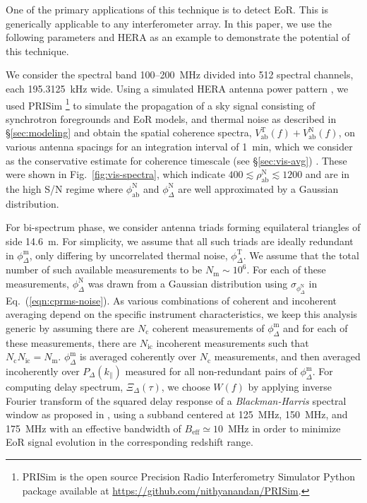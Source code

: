 \documentclass[
reprint,
superscriptaddress,
amsmath,
amssymb,
aps,
prd
]{revtex4-1}
\begin{document}
One of the primary applications of this technique is to detect EoR. This is generically applicable to any interferometer array. In this paper, we use the following parameters and HERA as an example to demonstrate the potential of this technique.

We consider the spectral band 100--200~MHz divided into 512 spectral channels, each 195.3125~kHz wide. Using a simulated HERA antenna power pattern \cite{deb17}, we used PRISim \footnote{PRISim is the open source Precision Radio Interferometry Simulator Python package available at \href{https://github.com/nithyanandan/PRISim}{https://github.com/nithyanandan/PRISim}.} to simulate the propagation of a sky signal consisting of synchrotron foregrounds and EoR models, and thermal noise as described in \S\ref{sec:modeling} and obtain the spatial coherence spectra, $V_\textrm{ab}^\textrm{T}(f) + V_\textrm{ab}^\textrm{N}(f)$, on various antenna spacings for an integration interval of 1~min, which we consider as the conservative estimate for coherence timescale (see \S\ref{sec:vis-avg}) \cite{car18}. These were shown in Fig.~\ref{fig:vis-spectra}, which indicate $400\lesssim \rho_\textrm{ab}^\textrm{N} \lesssim 1200$ and are in the high S/N regime where $\phi_\textrm{ab}^\textrm{N}$ and $\phi_\Delta^\textrm{N}$ are well approximated by a Gaussian distribution. 

For bi-spectrum phase, we consider antenna triads forming equilateral triangles of side 14.6~m. For simplicity, we assume that all such triads are ideally redundant in $\phi_\Delta^\textrm{m}$, only differing by uncorrelated thermal noise, $\phi_\Delta^\textrm{T}$. We assume that the total number of such available measurements to be $N_\textrm{m} \sim 10^6$. For each of these measurements, $\phi_\Delta^\textrm{N}$ was drawn from a Gaussian distribution using $\sigma_{\phi_\Delta^\textrm{N}}$ in Eq.~(\ref{eqn:cprms-noise}). As various combinations of coherent and incoherent averaging depend on the specific instrument characteristics, we keep this analysis generic by assuming there are $N_\textrm{c}$ coherent measurements of $\phi_\Delta^\textrm{m}$ and for each of these measurements, there are $N_\textrm{ic}$ incoherent measurements such that $N_\textrm{c}N_\textrm{ic}=N_\textrm{m}$. $\phi_\Delta^\textrm{m}$ is averaged coherently over $N_\textrm{c}$ measurements, and then averaged incoherently over $P_\Delta(k_\parallel)$ measured for all non-redundant pairs of $\phi_\Delta^\textrm{m}$. For computing delay spectrum, $\Xi_\Delta(\tau)$, we choose $W(f)$ by applying inverse Fourier transform of the squared delay response of a {\it Blackman-Harris} spectral window \cite{har78} as proposed in \cite{thy16}, using a subband centered at 125~MHz, 150~MHz, and 175~MHz with an effective bandwidth of $B_\textrm{eff}\simeq 10$~MHz in order to minimize EoR signal evolution in the corresponding redshift range.
\end{document}
